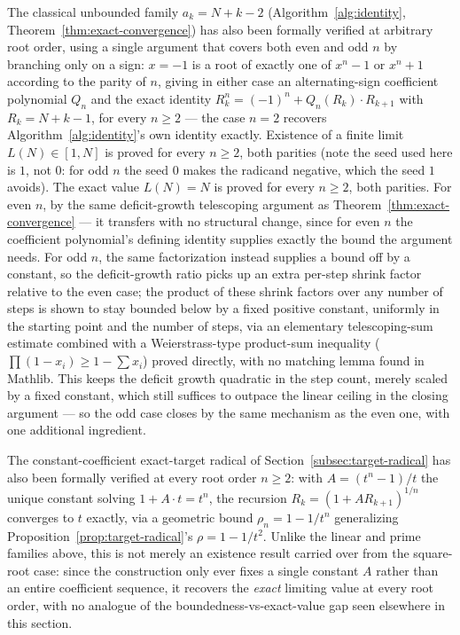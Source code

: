 \documentclass[11pt,a4paper]{amsart}
\theoremstyle{plain}
\theoremstyle{definition}
\theoremstyle{remark}
\begin{document}
The classical unbounded family $a_k=N+k-2$ (Algorithm~\ref{alg:identity}, Theorem~\ref{thm:exact-convergence}) has also been formally verified at arbitrary root order, using a single argument that covers both even and odd $n$ by branching only on a sign: $x=-1$ is a root of exactly one of $x^n-1$ or $x^n+1$ according to the parity of $n$, giving in either case an alternating-sign coefficient polynomial $Q_n$ and the exact identity $R_k^n=(-1)^n+Q_n(R_k)\cdot R_{k+1}$ with $R_k=N+k-1$, for every $n\ge 2$ — the case $n=2$ recovers Algorithm~\ref{alg:identity}'s own identity exactly. Existence of a finite limit $L(N)\in[1,N]$ is proved for every $n\ge 2$, both parities (note the seed used here is $1$, not $0$: for odd $n$ the seed $0$ makes the radicand negative, which the seed $1$ avoids). The exact value $L(N)=N$ is proved for every $n\ge 2$, both parities. For even $n$, by the same deficit-growth telescoping argument as Theorem~\ref{thm:exact-convergence} — it transfers with no structural change, since for even $n$ the coefficient polynomial's defining identity supplies exactly the bound the argument needs. For odd $n$, the same factorization instead supplies a bound off by a constant, so the deficit-growth ratio picks up an extra per-step shrink factor relative to the even case; the product of these shrink factors over any number of steps is shown to stay bounded below by a fixed positive constant, uniformly in the starting point and the number of steps, via an elementary telescoping-sum estimate combined with a Weierstrass-type product-sum inequality ($\prod(1-x_i)\ge 1-\sum x_i$) proved directly, with no matching lemma found in Mathlib. This keeps the deficit growth quadratic in the step count, merely scaled by a fixed constant, which still suffices to outpace the linear ceiling in the closing argument — so the odd case closes by the same mechanism as the even one, with one additional ingredient.

The constant-coefficient exact-target radical of Section~\ref{subsec:target-radical} has also been formally verified at every root order $n\ge 2$: with $A=(t^n-1)/t$ the unique constant solving $1+A\cdot t=t^n$, the recursion $R_k=(1+A R_{k+1})^{1/n}$ converges to $t$ exactly, via a geometric bound $\rho_n=1-1/t^n$ generalizing Proposition~\ref{prop:target-radical}'s $\rho=1-1/t^2$. Unlike the linear and prime families above, this is not merely an existence result carried over from the square-root case: since the construction only ever fixes a single constant $A$ rather than an entire coefficient sequence, it recovers the \emph{exact} limiting value at every root order, with no analogue of the boundedness-vs-exact-value gap seen elsewhere in this section.
\end{document}
